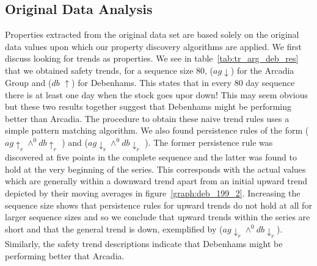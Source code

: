 {\begin{table}[ht]
\begin{center}
\end{center}
\caption{\label{tab:tr_arg_deb_res} Results for 199 days of Arcadia and
Debenhams Group }
\end{table}
}

\subsection{Original Data Analysis}\label{subsec:tr_analysis}

Properties extracted from the original data set are based solely on
the original data values upon which our property discovery algorithms
are applied. We first discuss looking for trends as properties. We see
in table~\ref{tab:tr_arg_deb_res} that we obtained safety trends, for
a sequence 
size 80,  ($ag \downarrow$) for the Arcadia Group and 
($db$ $\uparrow$) for Debenhams. This states that in every 80 day sequence
there is at least one day when the stock goes upor down! This may seem
obvious but these two results together suggest that Debenhams might be
performing better than Arcadia. The procedure to obtain these naive trend
rules uses a simple pattern matching algorithm. We also found 
persistence rules of the form 
   ($ag \uparrow_r \wedge^{0} db \uparrow_r$ ) and  
($ag \downarrow_r \wedge^{0} db \downarrow_r$ ). The former
persistence rule was 
discovered at five points in the complete sequence and the latter was found to
hold at the very beginning of the series. This corresponds with the
actual values which are generally within a downward trend apart from
an initial upward trend depicted by their moving averages in figure~\ref{graph:deb_199_2}. Increasing the sequence size shows that
persistence rules for upward trends do not hold at all for larger
sequence sizes and so we conclude that upward trends within the series
are short and that the general trend is down, exemplified by
 ($ag \downarrow_r \wedge^0 db \downarrow_r$). Similarly,
the safety 
trend descriptions indicate that Debenhams might be performing better
that Arcadia.
			

